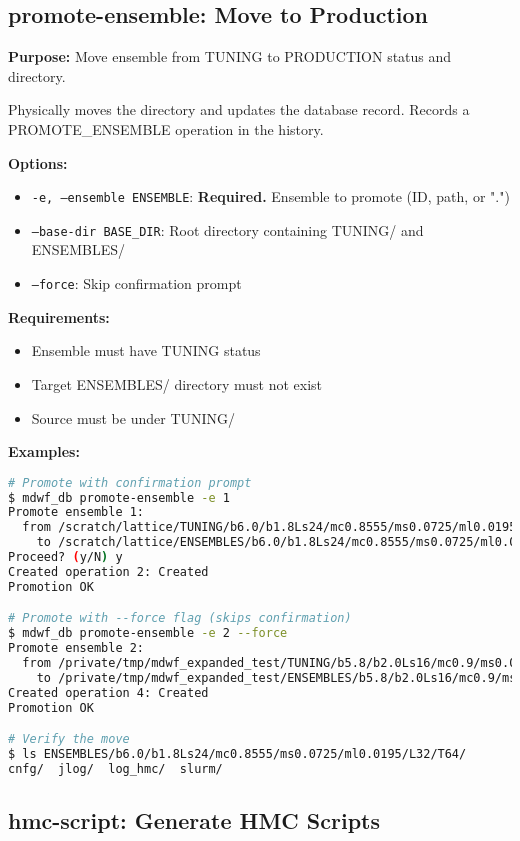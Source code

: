 \documentclass{article}
\begin{document}
\subsection{promote-ensemble: Move to Production}

\textbf{Purpose:} Move ensemble from TUNING to PRODUCTION status and directory.

Physically moves the directory and updates the database record. Records a PROMOTE\_ENSEMBLE operation in the history.

\textbf{Options:}
\begin{itemize}
\item \texttt{-e, --ensemble ENSEMBLE}: \textbf{Required.} Ensemble to promote (ID, path, or ".")
\item \texttt{--base-dir BASE\_DIR}: Root directory containing TUNING/ and ENSEMBLES/
\item \texttt{--force}: Skip confirmation prompt
\end{itemize}

\textbf{Requirements:}
\begin{itemize}
\item Ensemble must have TUNING status
\item Target ENSEMBLES/ directory must not exist
\item Source must be under TUNING/
\end{itemize}

\textbf{Examples:}
\begin{lstlisting}[language=bash]
# Promote with confirmation prompt
$ mdwf_db promote-ensemble -e 1
Promote ensemble 1:
  from /scratch/lattice/TUNING/b6.0/b1.8Ls24/mc0.8555/ms0.0725/ml0.0195/L32/T64
    to /scratch/lattice/ENSEMBLES/b6.0/b1.8Ls24/mc0.8555/ms0.0725/ml0.0195/L32/T64
Proceed? (y/N) y
Created operation 2: Created
Promotion OK

# Promote with --force flag (skips confirmation)
$ mdwf_db promote-ensemble -e 2 --force
Promote ensemble 2:
  from /private/tmp/mdwf_expanded_test/TUNING/b5.8/b2.0Ls16/mc0.9/ms0.08/ml0.02/L24/T48
    to /private/tmp/mdwf_expanded_test/ENSEMBLES/b5.8/b2.0Ls16/mc0.9/ms0.08/ml0.02/L24/T48
Created operation 4: Created
Promotion OK

# Verify the move
$ ls ENSEMBLES/b6.0/b1.8Ls24/mc0.8555/ms0.0725/ml0.0195/L32/T64/
cnfg/  jlog/  log_hmc/  slurm/
\end{lstlisting}

\subsection{hmc-script: Generate HMC Scripts}
\end{document}
